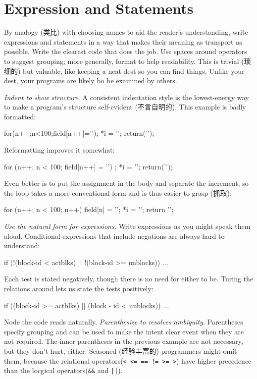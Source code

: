 \section{Expression and Statements}
\label{sec:exprstat}
By analogy (类比) with choosing names to aid the reader's understanding,
write expressions and statements in a way that makes their meaning as
transport as possible. Write the clearest code that does the job. Use
spaces around operators to suggest grouping; more generally, format to help
readability. This is trivial (琐细的) but valuable, like keeping a neat dest
so you can find things. Unlike your dest, your programs are likely bo be
examined by others.

\emph{Indent to show structure.} A consistent indentation style is the
lowest-energy way to make a program's structure self-evident (不言自明的).
This example is badly formatted:
\begin{badcode}
    for(n++;n<100;field[n++]='\0');
    *i = '\0'; return('\n');
\end{badcode}
Reformatting improves it somewhat:
\begin{badcode}
    for (n++; n < 100; field[n++] = '\0')
        ;
    *i = '\0';
    return('\n');
\end{badcode}
Even better is to put the assignment in the body and separate the
increment, so the loop takes a more conventional form and is thus easier to
grasp (抓取):
\begin{wellcode}
    for (n++; n < 100; n++)
        field[n] = '\0';
    *i = '\0';
    return '\n';
\end{wellcode}
\emph{Use the natural form for expressions.} Write expressions as you might
speak them aloud. Conditional expressions that include negations are always
hard to understand:
\begin{badcode}
    if (!(block-id < actblks) || !(block-id >= unblocks))
        ...
\end{badcode}
Each test is stated negatively, though there is no need for either to be.
Turing the relations around lets us state the tests positively:
\begin{wellcode}
    if ((block-id >= actblks) || (block - id < unblocks))
        ...
\end{wellcode}
Node the code reads naturally.
\emph{Parenthesize to resolves ambiguity.} Parentheses specify grouping and
can be used to make the intent clear event when they are not required. The
inner parentheses in the previous example are not necessary, but they don't
hurt, either. Seasoned (经验丰富的) programmers might omit them, because the
relational operators(\verb"< <= == != >= >") have higher precedence than
the locgical operators(\verb"&&" and \verb"||").

